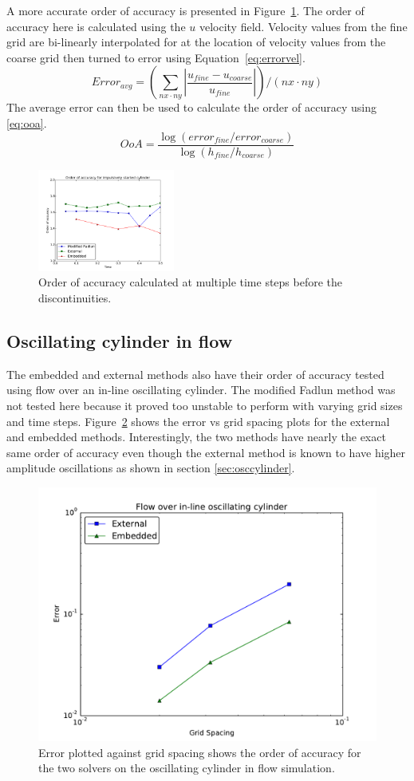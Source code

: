 A more accurate order of accuracy is presented in Figure~\ref{fig:cyerror2}. 
The order of accuracy here is calculated using the $u$ velocity field. 
Velocity values from the fine grid are bi-linearly interpolated for at the location of velocity values from the coarse grid then turned to error using Equation~\eqref{eq:errorvel}.
\begin{equation}
Error_{avg}=\left(\sum_{nx\cdot ny}^{} \left|\frac{u_{fine}-u_{coarse}}{u_{fine}}\right|\right)/(nx\cdot ny)
\label{eq:errorvel}
\end{equation}
The average error can then be used to calculate the order of accuracy using \eqref{eq:ooa}. 
\begin{equation}
OoA = \frac{\log \left(error_{fine}/error_{coarse}\right)}{\log \left(h_{fine}/h_{coarse}\right)}\label{eq:ooa}
\end{equation}

\begin{figure}[!htb]
	\centering
	\includegraphics[width=0.4\textwidth]{error_order_2_plt}
	\caption{Order of accuracy calculated at multiple time steps before the discontinuities.}
	\label{fig:cyerror2}
\end{figure}

\subsection{Oscillating cylinder in flow}
The embedded and external methods also have their order of accuracy tested using flow over an in-line oscillating cylinder. 
The modified Fadlun method was not tested here because it proved too unstable to perform with varying grid sizes and time steps. 
Figure~\ref{fig:oscerror} shows the error vs grid spacing plots for the external and embedded methods. 
Interestingly, the two methods have nearly the exact same order of accuracy even though the external method is known to have higher amplitude oscillations as shown in section \ref{sec:osccylinder}. 

\begin{figure}[!htb]
	\centering
	\includegraphics[width=0.4\linewidth]{error_oscflow}
	\caption{Error plotted against grid spacing shows the order of accuracy for the two solvers on the oscillating cylinder in flow simulation.}
	\label{fig:oscerror}
\end{figure}

